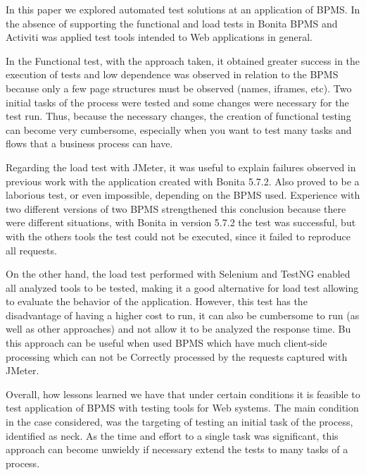 \documentclass[runningheads,a4paper]{llncs}
\begin{document}
In this paper we explored automated test solutions at an application of BPMS. In the absence of supporting the functional and load tests in Bonita BPMS and Activiti was applied test tools intended to Web applications in general.

In the Functional test, with the approach taken, it obtained greater success in the execution of tests and low dependence was observed in relation to the BPMS because only a few page structures must be observed (names, iframes, etc). Two initial tasks of the process  were tested and some changes were necessary for the test run. Thus, because the necessary changes, the creation of functional testing can become very cumbersome, especially when you want to test many tasks and flows that a business process can have.

Regarding the load test with JMeter, it was useful to explain failures observed in previous work with the application created with Bonita 5.7.2. Also proved to be a laborious test, or even impossible, depending on the BPMS used. Experience with two different versions of two BPMS strengthened this conclusion because there were different situations, with Bonita in version 5.7.2 the test was successful, but with the others tools the test could not be executed, since it failed to reproduce all requests. 

On the other hand, the load test performed with Selenium and TestNG enabled all analyzed tools to be tested, making it a good alternative for load test allowing to evaluate the behavior of the application. However, this test has the disadvantage of having a higher cost to run, it can also be cumbersome to run (as well as other approaches) and not allow it to be analyzed the response time. Bu this approach can be useful when used BPMS which have much client-side processing which can not be Correctly processed by the requests captured with JMeter.

Overall, how lessons learned we have that under certain conditions it is feasible to test application of BPMS with testing tools for Web systems. The main condition in the case considered, was the targeting of testing an initial task of the process, identified as neck. As the time and effort to a single task was significant, this approach can become unwieldy if necessary extend the tests to many tasks of a process.
\end{document}
